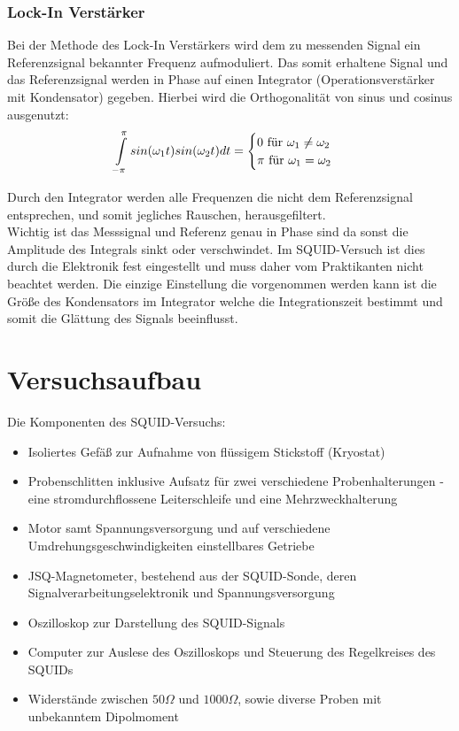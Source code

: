 \documentclass[12pt]{article}
\begin{document}
\subsubsection{Lock-In Verstärker}
Bei der Methode des Lock-In Verstärkers wird dem zu messenden Signal ein Referenzsignal bekannter Frequenz aufmoduliert.
Das somit erhaltene Signal und das Referenzsignal werden in Phase auf einen Integrator (Operationsverstärker mit Kondensator) gegeben. Hierbei wird die Orthogonalität von
sinus und cosinus ausgenutzt:
\begin{align}
 \int \limits_{-\pi} \limits^{\pi} sin(\omega_1 t)sin(\omega_2 t) dt = \begin{cases} 0 \textnormal{ für } \omega_1\neq\omega_2\\ \pi \textnormal{ für } \omega_1 = \omega_2\end{cases}
\end{align}


Durch den Integrator werden alle Frequenzen die nicht dem Referenzsignal entsprechen, und somit jegliches Rauschen, herausgefiltert. \\

Wichtig ist das Messsignal und Referenz genau in Phase sind da sonst die Amplitude des Integrals sinkt oder verschwindet. Im SQUID-Versuch ist dies durch die Elektronik fest eingestellt und muss daher vom Praktikanten nicht beachtet werden. Die einzige Einstellung die vorgenommen werden kann ist die Größe des Kondensators im Integrator welche die Integrationszeit bestimmt und somit die Glättung des Signals beeinflusst.


\section{Versuchsaufbau}
Die Komponenten des SQUID-Versuchs:
\begin{itemize}
 \item Isoliertes Gefäß zur Aufnahme von flüssigem Stickstoff (Kryostat)
 \item Probenschlitten inklusive Aufsatz für zwei verschiedene Probenhalterungen - eine stromdurchflossene Leiterschleife und eine Mehrzweckhalterung
 \item Motor samt Spannungsversorgung und auf verschiedene Umdrehungsgeschwindigkeiten einstellbares Getriebe
 \item JSQ-Magnetometer, bestehend aus der SQUID-Sonde, deren Signalverarbeitungselektronik und Spannungsversorgung
 \item Oszilloskop zur Darstellung des SQUID-Signals
 \item Computer zur Auslese des Oszilloskops und Steuerung des Regelkreises des SQUIDs
 \item Widerstände zwischen $50\Omega$ und $1000\Omega$, sowie diverse Proben mit unbekanntem Dipolmoment
\end{itemize}
\end{document}
